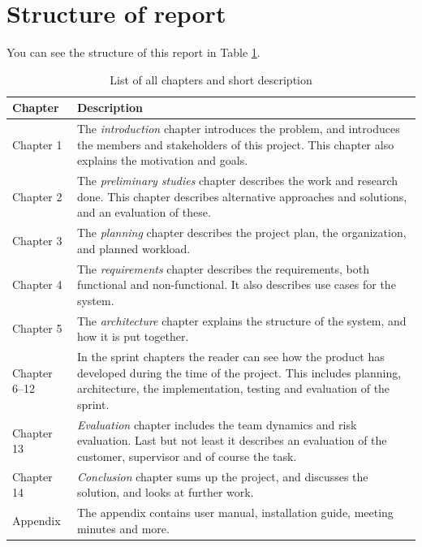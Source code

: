 \section{Structure of report}
You can see the structure of this report in Table \ref{tab:structure_of_report}.
\begin{table}[!ht]\centering
\caption{List of all chapters and short description}
\label{tab:structure_of_report}
\def\arraystretch{1.3}
\begin{tabularx}{\textwidth}{lX} \toprule[0.5mm]
\textbf{Chapter} & \textbf{Description} \\ \midrule
Chapter 1 & The \emph{introduction} chapter introduces the problem, and introduces the members and stakeholders of this project.
This chapter also explains the motivation and goals. \\

Chapter 2 &  The \emph{preliminary studies} chapter describes the work and research done. This chapter describes alternative approaches and solutions, and an evaluation of these. \\

Chapter 3 &  The \emph{planning} chapter describes the project plan, the organization, and planned workload.  \\

Chapter 4 &  The \emph{requirements} chapter describes the requirements, both functional and non-functional. It also describes use cases for the system. \\

Chapter 5	 &  The \emph{architecture} chapter explains the structure of the system, and how it is put together. \\

Chapter 6--12 	&  In the sprint chapters the reader can see how the product has developed during the time of the project. This includes planning, architecture, the implementation, testing and evaluation of the sprint. \\

Chapter 13 	 &  \emph{Evaluation} chapter includes the team dynamics and risk evaluation. Last but not least it describes an evaluation of the customer, supervisor and of course the task. \\

Chapter 14 	 &  \emph{Conclusion} chapter sums up the project, and discusses the solution, and looks at further work. \\

\midrule
Appendix 	 &   The appendix contains user manual, installation guide, meeting minutes and more.\\

\bottomrule[0.5mm]
\end{tabularx}
\end{table}

